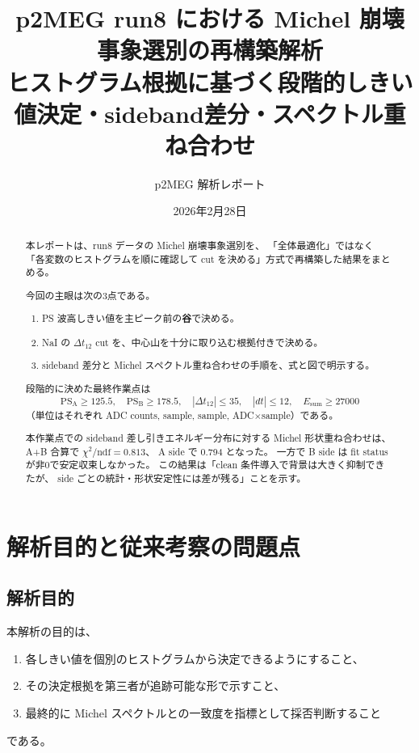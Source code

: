 \documentclass[a4paper,11pt]{jsarticle}
\title{p2MEG run8 における Michel 崩壊事象選別の再構築解析\\
ヒストグラム根拠に基づく段階的しきい値決定・sideband差分・スペクトル重ね合わせ}
\author{p2MEG 解析レポート}
\date{2026年2月28日}
\begin{document}
\maketitle

\begin{abstract}
本レポートは、run8 データの Michel 崩壊事象選別を、
「全体最適化」ではなく
「各変数のヒストグラムを順に確認して cut を決める」方式で再構築した結果をまとめる。

今回の主眼は次の3点である。
\begin{enumerate}
  \item PS 波高しきい値を主ピーク前の\textbf{谷}で決める。
  \item NaI の $\Delta t_{12}$ cut を、中心山を十分に取り込む根拠付きで決める。
  \item sideband 差分と Michel スペクトル重ね合わせの手順を、式と図で明示する。
\end{enumerate}

段階的に決めた最終作業点は
\[
\mathrm{PS_A}\ge 125.5,\quad
\mathrm{PS_B}\ge 178.5,\quad
|\Delta t_{12}|\le 35,\quad
|dt|\le 12,\quad
E_{\mathrm{sum}}\ge 27000
\]
（単位はそれぞれ ADC counts, sample, sample, ADC$\times$sample）である。

本作業点での sideband 差し引きエネルギー分布に対する Michel 形状重ね合わせは、
A+B 合算で $\chi^2/\mathrm{ndf}=0.813$、
A side で 0.794 となった。
一方で B side は fit status が非0で安定収束しなかった。
この結果は「clean 条件導入で背景は大きく抑制できたが、
side ごとの統計・形状安定性には差が残る」ことを示す。
\end{abstract}

\section{解析目的と従来考察の問題点}
\subsection{解析目的}
本解析の目的は、
\begin{enumerate}
  \item 各しきい値を個別のヒストグラムから決定できるようにすること、
  \item その決定根拠を第三者が追跡可能な形で示すこと、
  \item 最終的に Michel スペクトルとの一致度を指標として採否判断すること
\end{enumerate}
である。
\end{document}

